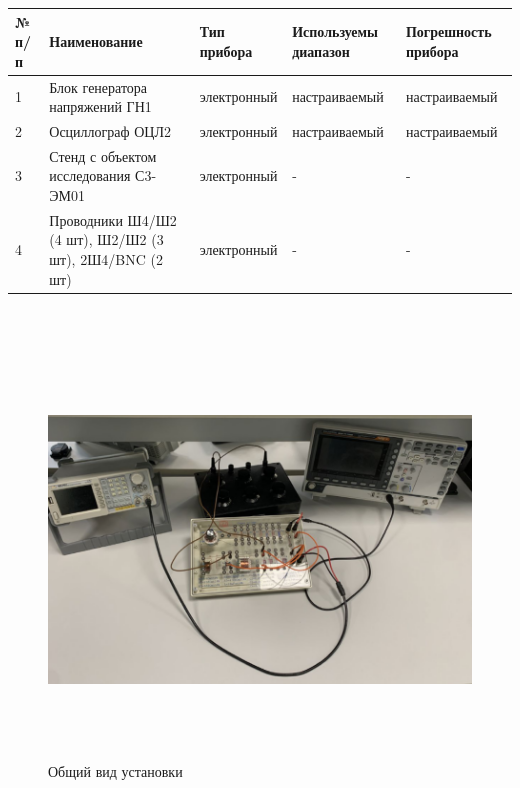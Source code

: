 \documentclass[14pt]{extarticle}
\begin{document}
    \begin{tabular}{ |m{0.7cm}|m{6cm}|m{3cm}|m{3.5cm}|m{3.5cm}| }
        \hline
        № п/п & Наименование & Тип прибора & Используемы диапазон & Погрешность прибора \\\hline
        1  & Блок генератора напряжений ГН1 & электронный & настраиваемый  & настраиваемый \\\hline
        2  & Осциллограф ОЦЛ2 & электронный & настраиваемый  & настраиваемый \\\hline
        3  & Стенд с объектом исследования С3-ЭМ01 & электронный & -  & - \\\hline
        4  & Проводники Ш4/Ш2 (4 шт), Ш2/Ш2 (3 шт), 2Ш4/BNC (2 шт) & электронный & -  & - \\\hline
    \end{tabular}
    \vspace*{5mm}\\

    \begin{figure}[h!]
        \centering
        \includegraphics[height=11cm]{img/tech.png}
        \caption{Общий вид установки}
    \end{figure}
    
    \newpage
\end{document}
